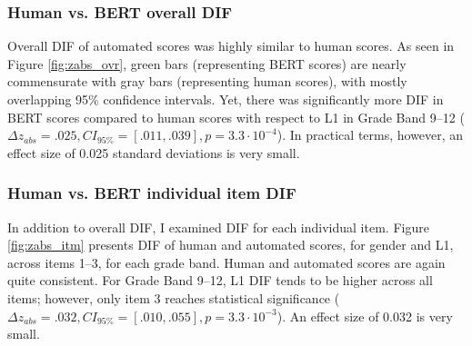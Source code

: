 \documentclass [PhD] {uclathes}
\begin{document}
\subsubsection{Human vs. BERT overall DIF}

Overall DIF of automated scores was highly similar to human scores. As seen in Figure \ref{fig:zabs_ovr}, green bars (representing BERT scores) are nearly commensurate with gray bars (representing human scores), with mostly overlapping 95\% confidence intervals. Yet, there was significantly more DIF in BERT scores compared to human scores with respect to L1 in Grade Band 9–12 ($\Delta z_{abs} = .025, CI_{95\%} = [.011, .039], p = 3.3 \cdot 10^{-4}$). In practical terms, however, an effect size of 0.025 standard deviations is very small. 

\subsubsection{Human vs. BERT individual item DIF}

In addition to overall DIF, I examined DIF for each individual item. Figure \ref{fig:zabs_itm} presents DIF of human and automated scores, for gender and L1, across items 1–3, for each grade band. Human and automated scores are again quite consistent. For Grade Band 9–12, L1 DIF tends to be higher across all items; however, only item 3 reaches statistical significance ($\Delta z_{abs} = .032, CI_{95\%} = [.010, .055], p = 3.3 \cdot 10^{-3}$). An effect size of 0.032 is very small.
\end{document}
